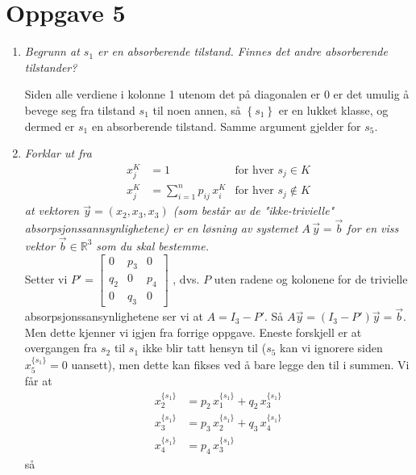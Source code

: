 \documentclass{article}[norsk]
\begin{document}
\section*{Oppgave 5}
\begin{enumerate}[label=\alph*)]
	\item \textit{Begrunn at $s_1$ er en absorberende tilstand. Finnes det andre absorberende tilstander?} 
    
    
    Siden alle verdiene i kolonne 1 utenom det på diagonalen er 0 er det umulig å bevege seg fra tilstand $s_1$ til noen annen, så $\left\{s_1\right\}$ er en lukket klasse, og dermed er $s_1$ en absorberende tilstand. Samme argument gjelder for $s_5$.
    \item \textit{Forklar ut fra} 
    \begin{equation*} \begin{aligned}
    x_j^K &= 1 &\text{for hver } s_j \in K\\
    x_j^K &= \sum_{i=1}^np_{ij}\,x_i^K &\text{for hver } s_j \notin K
    \end{aligned} \end{equation*}
\textit{at vektoren $\vec{y}=\left(x_2,x_3,x_3\right)$ (som består av de "ikke-trivielle" absorpsjonssannsynlighetene) er en løsning av systemet $A\,\vec{y} = \vec{b}$  for en viss vektor $\vec{b} \in \mathbb{R}^3$ som du skal bestemme.}\\

    Setter vi 
    $\displaystyle P'=\begin{bmatrix}
    	0	&p_3	&0\\
        q_2	&0	&p_4\\
        0	&q_3	&0
    \end{bmatrix}$
    , dvs. $P$ uten radene og kolonene for de trivielle absorpsjonssansynlighetene ser vi at $A=I_3 - P'$. Så $A \vec{y} = (I_ 3 - P') \vec{y} = \vec{b}$. Men dette kjenner vi igjen fra forrige oppgave. Eneste forskjell er at overgangen fra $s_2$ til $s_1$ ikke blir tatt hensyn til ($s_5$ kan vi ignorere siden $x_5^{\{s_1\}}=0$ uansett), men dette kan fikses ved å bare legge den til i summen. Vi får at
\begin{equation*} \begin{aligned}
	x_2^{\{s_1\}}&=p_{2} \, x_1^{\{s_1\}} + q_{2} \, x_3^{\{s_1\}}\\
	x_3^{\{s_1\}}&=p_{3} \, x_2^{\{s_1\}} + q_{3} \, x_4^{\{s_1\}}\\
	x_4^{\{s_1\}}&=p_{4} \, x_3^{\{s_1\}}
\end{aligned} \end{equation*}
så


\end{enumerate}
\end{document}
